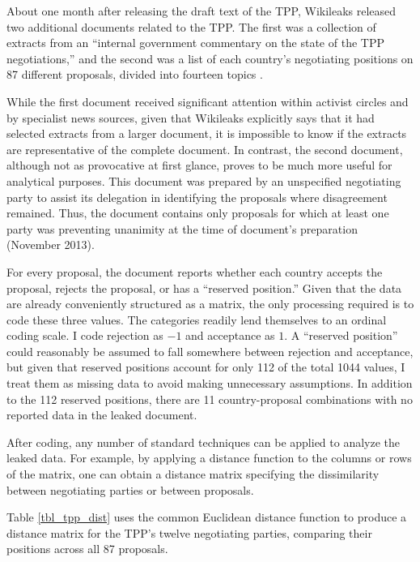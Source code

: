 \documentclass[12pt]{article}
\begin{document}
About one month after releasing the draft text of the TPP, Wikileaks released two 
additional documents related to the TPP. The first was a collection of extracts from an ``internal 
government commentary on the state of the TPP negotiations,'' and the second was a list of each 
country's negotiating positions on 87 different 
proposals, divided into fourteen topics \citep{wikileaks2013second}.

While the first document received significant 
attention within activist circles and by specialist news sources, given that Wikileaks 
explicitly says that it had selected extracts from a larger document, it is impossible to know if the  
extracts are representative of the complete document. In contrast, the second document, although 
not as provocative at first glance, proves to be much more useful for 
analytical purposes. This document was prepared by an unspecified 
negotiating party to assist its delegation in identifying the proposals where disagreement remained. 
Thus, the document contains only proposals for which at least one party was preventing unanimity at 
the time of document's preparation (November 2013).

For every proposal, the document reports whether each country accepts the proposal, rejects the 
proposal, 
or has a ``reserved position.''	Given that the data are already conveniently structured as a matrix, 
the only processing required is to code these three values. The categories 
readily lend themselves to an ordinal coding scale. I code rejection as $-1$ and acceptance as 
$1$. A 
``reserved position'' could reasonably be assumed to fall somewhere between rejection and acceptance, 
but given that reserved positions account for only 112 of the total 1044 values, I treat them as 
missing data to avoid making unnecessary assumptions. In addition to the 112 reserved positions, 
there are 11 country-proposal combinations with no reported data in the leaked document.

After coding, any number of standard techniques can be applied 
to analyze the leaked data. For example, by applying a distance function to the columns or rows of 
the matrix, one can obtain a distance matrix specifying the dissimilarity between negotiating 
parties or between proposals. 

Table \ref{tbl_tpp_dist} uses the common Euclidean distance function 
to produce a 
distance matrix for the TPP's twelve negotiating parties, comparing their positions across all 
87 proposals.
\end{document}
